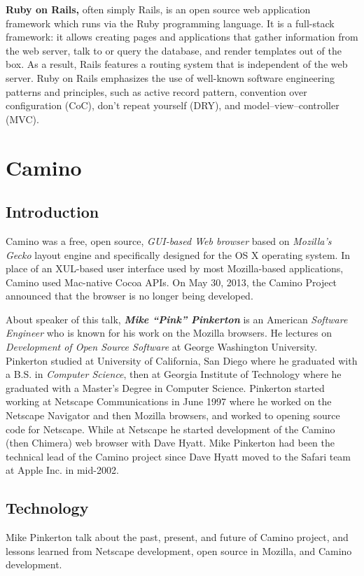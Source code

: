 \documentclass[11pt]{article}
\begin{document}
\textbf{Ruby on Rails,} often simply Rails, is an open source web application framework which runs via the Ruby programming language. It is a full-stack framework: it allows creating pages and applications that gather information from the web server, talk to or query the database, and render templates out of the box. As a result, Rails features a routing system that is independent of the web server. Ruby on Rails emphasizes the use of well-known software engineering patterns and principles, such as active record pattern, convention over configuration (CoC), don't repeat yourself (DRY), and model–view–controller (MVC).

\newpage


\section{Camino}

\subsection{Introduction}
Camino was a free, open source, \emph{GUI-based Web browser} based on \emph{Mozilla's Gecko }layout engine and specifically designed for the OS X operating system. In place of an XUL-based user interface used by most Mozilla-based applications, Camino used Mac-native Cocoa APIs. On May 30, 2013, the Camino Project announced that the browser is no longer being developed.

About speaker of this talk, \textbf{\emph{Mike ``Pink'' Pinkerton}} is an American \emph{Software Engineer} who is known for his work on the Mozilla browsers. He lectures on \emph{Development of Open Source Software} at George Washington University. Pinkerton studied at University of California, San Diego where he graduated with a B.S. in \emph{Computer Science}, then at Georgia Institute of Technology where he graduated with a Master's Degree in Computer Science. Pinkerton started working at Netscape Communications in June 1997 where he worked on the Netscape Navigator and then Mozilla browsers, and worked to opening source code for Netscape. While at Netscape he started development of the Camino (then Chimera) web browser with Dave Hyatt.  Mike Pinkerton had been the technical lead of the Camino project since Dave Hyatt moved to the Safari team at Apple Inc. in mid-2002.

\subsection{Technology}
Mike Pinkerton talk about the past, present, and future of Camino project, and lessons learned from Netscape development, open source in Mozilla, and Camino development.
\end{document}
